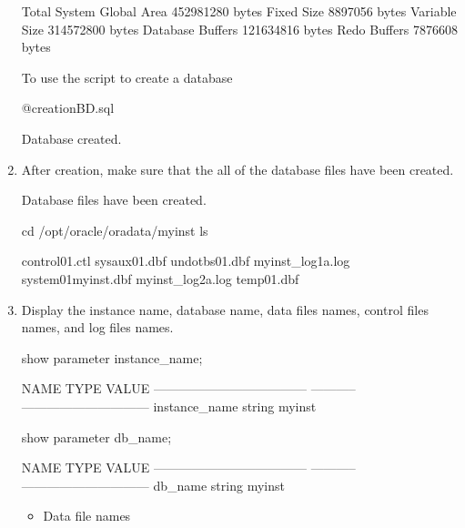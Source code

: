 \documentclass{article}
\begin{document}
\begin{enumerate}
\begin{messageshell}
Total System Global Area  452981280 bytes
Fixed Size                  8897056 bytes
Variable Size             314572800 bytes
Database Buffers          121634816 bytes
Redo Buffers                7876608 bytes
        \end{messageshell}
        To use the script to create a database
        \begin{sqlshell}
            @creationBD.sql
        \end{sqlshell}
        \begin{messageshell}
            Database created.
        \end{messageshell}
    \item After creation, make sure that the all of the database files have been created.

        Database files have been created.
        \begin{commandshell}
            cd /opt/oracle/oradata/myinst
            ls
        \end{commandshell}
        \begin{messageshell}
control01.ctl     sysaux01.dbf        undotbs01.dbf
myinst_log1a.log  system01myinst.dbf
myinst_log2a.log  temp01.dbf
        \end{messageshell}
    \item Display the instance name, database name, data files names, control files names, and log files names.
        \begin{sqlshell}
            show parameter instance_name;
        \end{sqlshell}
        \begin{messageshell}
NAME                                 TYPE        VALUE
------------------------------------ ----------- ------------------------------
instance_name                        string      myinst
        \end{messageshell}
        \begin{sqlshell}
            show parameter db_name;
        \end{sqlshell}
        \begin{messageshell}
NAME                                 TYPE        VALUE
------------------------------------ ----------- ------------------------------
db_name                              string      myinst
        \end{messageshell}
        \begin{itemize}
            \item Data file names
                \begin{sqlshell}

\end{sqlshell}
\end{itemize}
\end{enumerate}
\end{document}
